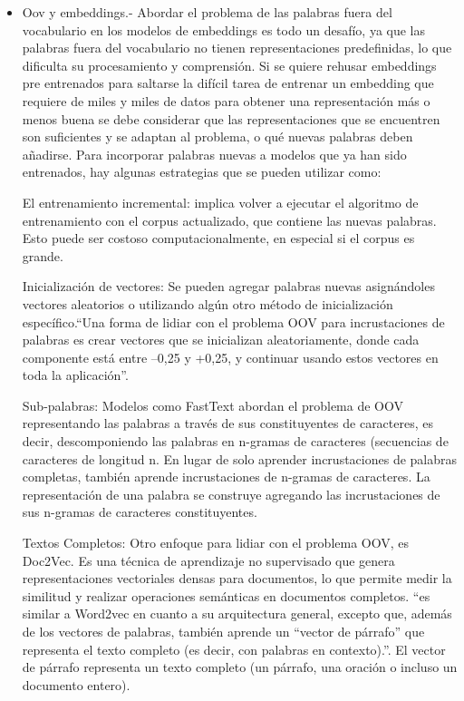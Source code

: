 \begin{itemize}
\begin{itemize}
	\item Oov y embeddings.- Abordar el problema de las palabras fuera del vocabulario en los modelos de embeddings es todo un desafío, ya que  las palabras fuera del vocabulario no tienen representaciones predefinidas, lo que dificulta su procesamiento y comprensión. Si se quiere rehusar embeddings pre entrenados para saltarse la difícil tarea de entrenar un embedding que requiere de miles y miles de datos para obtener una representación más o menos buena se debe considerar que las representaciones que se encuentren son suficientes y se adaptan al problema, o qué nuevas palabras deben añadirse. Para incorporar palabras nuevas a modelos que ya han sido entrenados, hay algunas estrategias que se pueden utilizar como:

El entrenamiento incremental: implica volver a ejecutar el algoritmo de entrenamiento con el corpus actualizado, que contiene las nuevas palabras. Esto puede ser costoso computacionalmente, en especial si el corpus es grande. 

Inicialización de vectores: Se pueden agregar palabras nuevas asignándoles vectores aleatorios o utilizando algún otro método de inicialización específico.``Una forma de lidiar con el problema OOV para incrustaciones de palabras es crear vectores que se inicializan aleatoriamente, donde cada componente está entre –0,25 y +0,25, y continuar usando estos vectores en toda la aplicación''\cite[p. 105]{vajjala2020practical}.

Sub-palabras: Modelos como FastText abordan el problema de OOV representando las palabras a través de sus constituyentes de caracteres, es decir, descomponiendo las palabras en n-gramas de caracteres (secuencias de caracteres de longitud n. En lugar de solo aprender incrustaciones de palabras completas, también aprende incrustaciones de n-gramas de caracteres. La representación de una palabra se construye agregando las incrustaciones de sus n-gramas de caracteres constituyentes.

Textos Completos:  Otro enfoque para lidiar con el problema OOV, es Doc2Vec. Es una técnica de aprendizaje no supervisado que genera representaciones vectoriales densas para documentos, lo que permite medir la similitud y realizar operaciones semánticas en documentos completos. ``es similar a Word2vec en cuanto a su arquitectura general, excepto que, además de los vectores de palabras, también aprende un ``vector de párrafo'' que representa el texto completo (es decir, con palabras en contexto).''\cite[p.106]{vajjala2020practical}. El vector de párrafo representa un texto completo (un párrafo, una oración o incluso un documento entero). 


\end{itemize}
\end{itemize}
